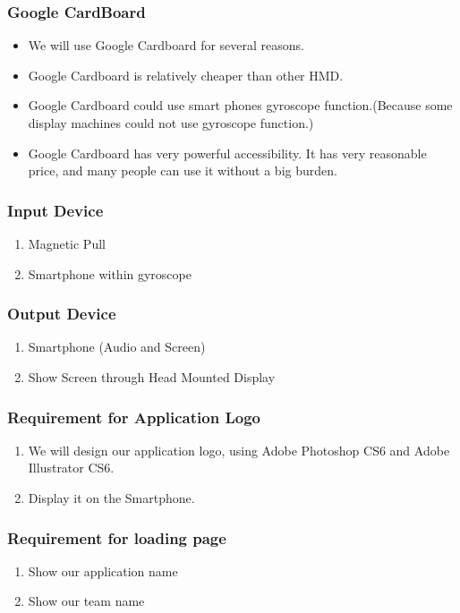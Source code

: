 \documentclass[12pt]{article}
\begin{document}
\subsubsection{Google CardBoard}

\begin{itemize}
\item We will use Google Cardboard for several reasons.
\item Google Cardboard is relatively cheaper than other HMD.
\item Google Cardboard could use smart phones gyroscope function.(Because some display machines could not use gyroscope function.)
\item Google Cardboard has very powerful accessibility. It has very reasonable price, and many people can use it without a big burden.
\end{itemize}

\subsubsection{Input Device}
\begin{enumerate}
\item Magnetic Pull
\item Smartphone within gyroscope
\end{enumerate}

\subsubsection{Output Device}
\begin{enumerate}
\item Smartphone (Audio and Screen)
\item Show Screen through Head Mounted Display
\end{enumerate}

\subsubsection{Requirement for Application Logo}
\begin{enumerate}
\item We will design our application logo, using Adobe Photoshop CS6 and Adobe Illustrator CS6.
\item Display it on the Smartphone.
\end{enumerate}

\subsubsection{Requirement for loading page}
\begin{enumerate}
\item Show our application name
\item Show our team name
\end{enumerate}
\end{document}
